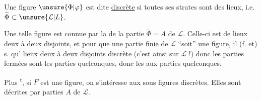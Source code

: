 
\noindent\llap{\smash{\rule[-1.7\baselineskip]{0.4pt}{1.6\baselineskip}}\enspace}\uline{}\quad Une figure  $\unsure{\Phi|\varphi}$ est dite
\uline{discrète} si toutes ses  strates sont
des lieux, i.e. $\widetilde\Phi\subset\unsure{\mathcal L|L}$.

\quad {}Une telle figure est connue
par la  de la partie $\widetilde\Phi=A$
de $\mathcal L$. Celle-ci est  de
lieux deux à deux disjoints, et 
pour que une partie \uline{finie} de $\mathcal L$ ``soit''
une figure, il (f. et) s. qu'
 lieux deux à deux
disjoints 
discrète (c'est ainsi sur $\mathcal L$ !) donc
les parties fermées sont les parties
quelconques, donc les  
 aux parties quelconques.

Plus \textsuperscript{t}, si $F$ est une figure,
on s'intéresse aux sous figures discrètes.
Elles sont décrites par  
parties $A$ de $\mathcal L$.

